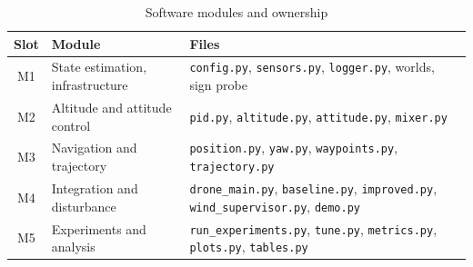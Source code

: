 \begin{table}[h]
\centering
\caption{Software modules and ownership}
\label{tab:files}
\begin{tabular}{|c|P{4.2cm}|P{8cm}|}
\hline
\textbf{Slot} & \textbf{Module} & \textbf{Files} \\ \hline
M1 & State estimation, infrastructure & \texttt{config.py}, \texttt{sensors.py}, \texttt{logger.py}, worlds, sign probe \\ \hline
M2 & Altitude and attitude control & \texttt{pid.py}, \texttt{altitude.py}, \texttt{attitude.py}, \texttt{mixer.py} \\ \hline
M3 & Navigation and trajectory & \texttt{position.py}, \texttt{yaw.py}, \texttt{waypoints.py}, \texttt{trajectory.py} \\ \hline
M4 & Integration and disturbance & \texttt{drone\_main.py}, \texttt{baseline.py}, \texttt{improved.py}, \texttt{wind\_supervisor.py}, \texttt{demo.py} \\ \hline
M5 & Experiments and analysis & \texttt{run\_experiments.py}, \texttt{tune.py}, \texttt{metrics.py}, \texttt{plots.py}, \texttt{tables.py} \\ \hline
\end{tabular}
\end{table}
